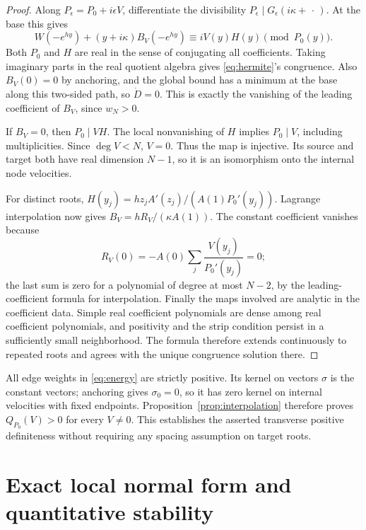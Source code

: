 \documentclass[11pt]{article}
\theoremstyle{remark}\newtheorem{remark}[theorem]{Remark}
\begin{document}
\begin{proof}
Along $P_\epsilon=P_0+i\epsilon V$, differentiate the divisibility
$P_\epsilon\mid G_\epsilon(i\kappa+\,\cdot\,)$. At the base this gives
\[
 W(-e^{hy})+(y+i\kappa)B_V(-e^{hy})
       \equiv iV(y)H(y)\pmod{P_0(y)}.
\]
Both $P_0$ and $H$ are real in the sense of conjugating all coefficients.
Taking imaginary parts in the real quotient algebra gives
\eqref{eq:hermite}'s congruence. Also $B_V(0)=0$ by anchoring, and the
global bound has a minimum at the base along this two-sided path, so
$\dot D=0$. This is exactly the vanishing of the leading coefficient
of $B_V$, since $w_N>0$.

If $B_V=0$, then $P_0\mid VH$. The local nonvanishing of $H$ implies
$P_0\mid V$, including multiplicities. Since $\deg V<N$, $V=0$.
Thus the map is injective. Its source and target both have real dimension
$N-1$, so it is an isomorphism onto the internal node velocities.

For distinct roots,
$H(y_j)=hz_jA'(z_j)/(A(1)P_0'(y_j))$. Lagrange interpolation now gives
$B_V=hR_V/(\kappa A(1))$. The constant coefficient vanishes because
\[
 R_V(0)=-A(0)\sum_j\frac{V(y_j)}{P_0'(y_j)}=0;
\]
the last sum is zero for a polynomial of degree at most $N-2$, by the
leading-coefficient formula for interpolation. Finally the maps involved
are analytic in the coefficient data. Simple real coefficient polynomials
are dense among real coefficient polynomials, and positivity and the strip
condition persist in a sufficiently small neighborhood. The formula
therefore extends continuously to repeated roots and agrees with the
unique congruence solution there.
\end{proof}

All edge weights in \eqref{eq:energy} are strictly positive. Its kernel
on vectors $\sigma$ is the constant vectors; anchoring gives
$\sigma_0=0$, so it has zero kernel on internal velocities with fixed
endpoints. Proposition~\ref{prop:interpolation} therefore proves
$Q_{P_0}(V)>0$ for every $V\ne0$. This establishes the asserted transverse
positive definiteness without requiring any spacing assumption on target
roots.

\section{Exact local normal form and quantitative stability}
\end{document}
